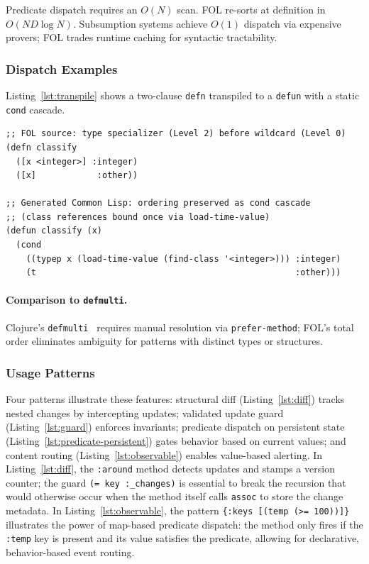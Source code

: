 \documentclass[sigconf,nonacm]{acmart}
\begin{document}
Predicate dispatch requires an $O(N)$ scan.
FOL re-sorts at definition in $O(N D \log N)$.
Subsumption systems achieve $O(1)$ dispatch via expensive provers; FOL trades runtime caching for syntactic tractability.

\subsubsection{Dispatch Examples}
Listing~\ref{lst:transpile} shows a two-clause \texttt{defn} transpiled to a \texttt{defun} with a static \texttt{cond} cascade.

\begin{lstlisting}[caption={Transpilation: specificity-ordered multi-clause \texttt{defn}}, label={lst:transpile}]
;; FOL source: type specializer (Level 2) before wildcard (Level 0)
(defn classify
  ([x <integer>] :integer)
  ([x]            :other))

;; Generated Common Lisp: ordering preserved as cond cascade
;; (class references bound once via load-time-value)
(defun classify (x)
  (cond
    ((typep x (load-time-value (find-class '<integer>))) :integer)
    (t                                                   :other)))
\end{lstlisting}

\paragraph{Comparison to \texttt{defmulti}.}
Clojure's \texttt{defmulti}~\cite{Hickey2008} requires manual resolution via \texttt{prefer-method}; FOL's total order eliminates ambiguity for patterns with distinct types or structures.

\subsubsection{Usage Patterns}
Four patterns illustrate these features:
structural diff (Listing~\ref{lst:diff}) tracks nested changes by intercepting updates;
validated update guard (Listing~\ref{lst:guard}) enforces invariants;
predicate dispatch on persistent state (Listing~\ref{lst:predicate-persistent}) gates behavior based on current values;
and content routing (Listing~\ref{lst:observable}) enables value-based alerting.
In Listing~\ref{lst:diff}, the \texttt{:around} method detects updates and stamps a version counter; the guard \texttt{(= key :\_changes)} is essential to break the recursion that would otherwise occur when the method itself calls \texttt{assoc} to store the change metadata.
In Listing~\ref{lst:observable}, the pattern \texttt{\{:keys [(temp (>= 100))]\}} illustrates the power of map-based predicate dispatch: the method only fires if the \texttt{:temp} key is present and its value satisfies the predicate,
allowing for declarative, behavior-based event routing.
\end{document}
